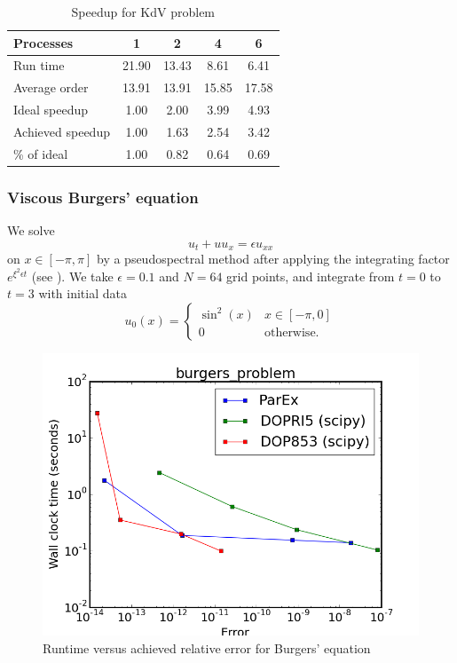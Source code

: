 \documentclass[12pt]{article}
\begin{document}
\begin{table}
\caption{Speedup for KdV problem\label{tbl:KdV}}{
\begin{tabular}{lcccc}\\
Processes & 1 & 2 & 4 & 6\\ \hline
Run time & 21.90 & 13.43 &  8.61 &  6.41 \\
Average order & 13.91 & 13.91 & 15.85 & 17.58 \\
Ideal speedup &  1.00 &  2.00 &  3.99 &  4.93 \\
Achieved speedup &  1.00 &  1.63 &  2.54 &  3.42 \\
\% of ideal &  1.00 &  0.82 &  0.64 &  0.69 \\ \hline
\end{tabular}}
\end{table}


\subsubsection{Viscous Burgers' equation}
We solve
$$
u_t+uu_x=\epsilon u_{xx}
$$
on $x \in [-\pi,\pi]$ by a pseudospectral method after applying the
integrating factor $e^{\xi^2 \epsilon t}$ (see \cite[p. 113, Exercise 10.6]{trefethen_spectral}).
We take $\epsilon = 0.1$ and $N=64$ grid points, and integrate from
$t=0$ to $t=3$ with initial data
$$
u_0(x) = \begin{cases} \sin^2(x) &  x \in [-\pi,0] \\ 0 & \mbox{otherwise.} \end{cases}
$$
\begin{figure}[h]
 \includegraphics[scale=0.5]{images/burgers_problem_err_vs_time.png}
\centering
\caption{Runtime versus achieved relative error for Burgers' equation}
\end{figure}
\end{document}
